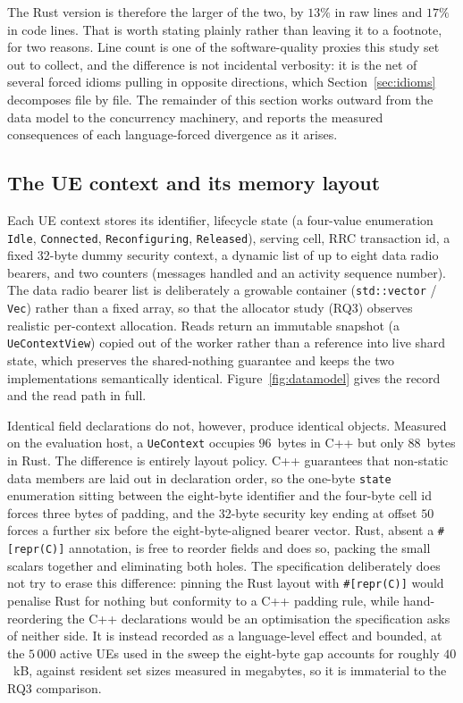 \documentclass[english,twoside,openright,a4paper,censored,csm,software-track-2020]{HYthesisML}
\begin{document}
The Rust version is therefore the larger of the two, by $13\%$ in raw lines and $17\%$ in code
lines. That is worth stating plainly rather than leaving it to a footnote, for two reasons. Line
count is one of the software-quality proxies this study set out to collect, and the difference
is not incidental verbosity: it is the net of several forced idioms pulling in opposite
directions, which Section~\ref{sec:idioms} decomposes file by file. The remainder of this
section works outward from the data model to the concurrency machinery, and reports the measured
consequences of each language-forced divergence as it arises.

\subsection{The UE context and its memory layout}\label{sec:uecontext}
Each UE context stores its identifier, lifecycle state (a four-value enumeration
\texttt{Idle}, \texttt{Connected}, \texttt{Reconfiguring}, \texttt{Released}), serving cell,
RRC transaction id, a fixed 32-byte dummy security context, a dynamic list of up to eight data
radio bearers, and two counters (messages handled and an activity sequence number). The data
radio bearer list is deliberately a growable container (\texttt{std::vector} / \texttt{Vec})
rather than a fixed array, so that the allocator study (RQ3) observes realistic per-context
allocation. Reads return an immutable snapshot (a \texttt{UeContextView}) copied out of the
worker rather than a reference into live shard state, which preserves the shared-nothing
guarantee and keeps the two implementations semantically identical.
Figure~\ref{fig:datamodel} gives the record and the read path in full.

Identical field declarations do not, however, produce identical objects. Measured on the
evaluation host, a \texttt{UeContext} occupies $96$~bytes in C++ but only $88$~bytes in Rust.
The difference is entirely layout policy. C++ guarantees that non-static data members are laid
out in declaration order, so the one-byte \texttt{state} enumeration sitting between the
eight-byte identifier and the four-byte cell id forces three bytes of padding, and the
32-byte security key ending at offset $50$ forces a further six before the eight-byte-aligned
bearer vector. Rust, absent a \texttt{\#[repr(C)]} annotation, is free to reorder fields and
does so, packing the small scalars together and eliminating both holes. The specification
deliberately does not try to erase this difference: pinning the Rust layout with
\texttt{\#[repr(C)]} would penalise Rust for nothing but conformity to a C++ padding rule,
while hand-reordering the C++ declarations would be an optimisation the specification asks of
neither side. It is instead recorded as a language-level effect and bounded, at the $5\,000$
active UEs used in the sweep the eight-byte gap accounts for roughly $40$~kB, against resident
set sizes measured in megabytes, so it is immaterial to the RQ3 comparison.
\end{document}
